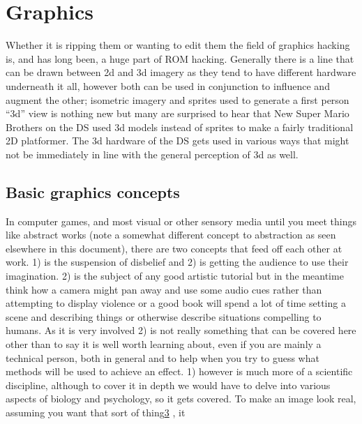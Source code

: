 \documentclass[
]{book}
\begin{document}
\hypertarget{graphics}{%
\chapter{Graphics}\label{graphics}}

Whether it is ripping them or wanting to edit them the field of graphics hacking is, and has long been, a huge part of ROM hacking. Generally there is a line that can be drawn between 2d and 3d imagery as they tend to have different hardware underneath it all, however both can be used in conjunction to influence and augment the other; isometric imagery and sprites used to generate a first person ``3d'' view is nothing new but many are surprised to hear that New Super Mario Brothers on the DS used 3d models instead of sprites to make a fairly traditional 2D platformer. The 3d hardware of the DS gets used in various ways that might not be immediately in line with the general perception of 3d as well.

\hypertarget{basic-graphics-concepts}{%
\section{Basic graphics concepts}\label{basic-graphics-concepts}}

In computer games, and most visual or other sensory media until you meet things like abstract works (note a somewhat different concept to abstraction as seen elsewhere in this document), there are two concepts that feed off each other at work. 1) is the suspension of disbelief and 2) is getting the audience to use their imagination. 2) is the subject of any good artistic tutorial but in the meantime think how a camera might pan away and use some audio cues rather than attempting to display violence or a good book will spend a lot of time setting a scene and describing things or otherwise describe situations compelling to humans. As it is very involved 2) is not really something that can be covered here other than to say it is well worth learning about, even if you are mainly a technical person, both in general and to help when you try to guess what methods will be used to achieve an effect. 1) however is much more of a scientific discipline, although to cover it in depth we would have to delve into various aspects of biology and psychology, so it gets covered. To make an image look real, assuming you want that sort of thing\href{romhacking20204.html\#fn3x0}{3} , it
\end{document}
